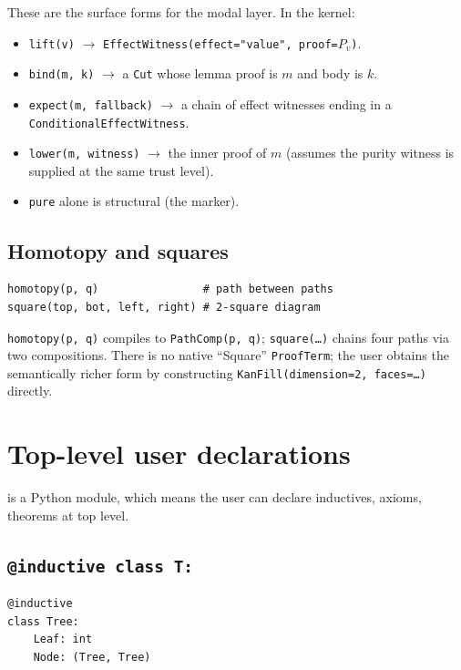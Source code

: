 These are the surface forms for the modal layer.  In the kernel:
\begin{itemize}[leftmargin=1.7em]
  \item \texttt{lift(v)} $\to$ \texttt{EffectWitness(effect="value", proof=$P_v$)}.
  \item \texttt{bind(m, k)} $\to$ a \texttt{Cut} whose lemma proof is
    $m$ and body is $k$.
  \item \texttt{expect(m, fallback)} $\to$ a chain of effect
    witnesses ending in a \texttt{ConditionalEffectWitness}.
  \item \texttt{lower(m, witness)} $\to$ the inner proof of $m$
    (assumes the purity witness is supplied at the same trust
    level).
  \item \texttt{pure} alone is structural (the marker).
\end{itemize}

\subsection{Homotopy and squares}

\begin{lstlisting}[language=psdl]
homotopy(p, q)                # path between paths
square(top, bot, left, right) # 2-square diagram
\end{lstlisting}

\texttt{homotopy(p, q)} compiles to \texttt{PathComp(p, q)};
\texttt{square(\dots)} chains four paths via two compositions.
There is no native ``Square'' \texttt{ProofTerm}; the user obtains
the semantically richer form by constructing
\texttt{KanFill(dimension=2, faces=\dots)} directly.

\section{Top-level user declarations}
\label{sec:psdl-toplevel}

\PSDL{} is a Python module, which means the user can declare
inductives, axioms, theorems at top level.

\subsection{\texttt{@inductive class T:}}

\begin{lstlisting}[language=psdl]
@inductive
class Tree:
    Leaf: int
    Node: (Tree, Tree)
\end{lstlisting}

